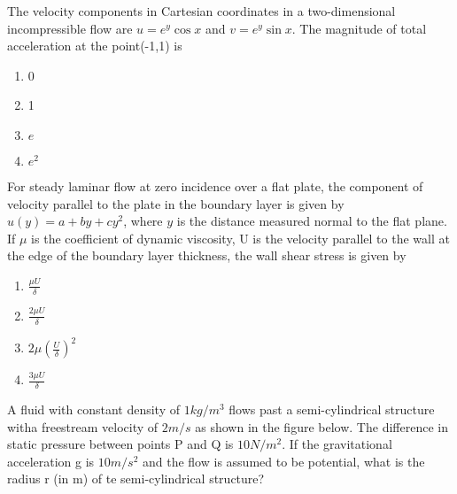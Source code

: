 \item The velocity components in Cartesian coordinates in a two-dimensional incompressible flow are $u=e^y\cos{x}$ and $v=e^y\sin{x}$. The magnitude of total acceleration at the point(-1,1) is
\begin{multicols}{2}   
\begin{enumerate}
    \item 0
    \item 1
    \item $e$
    \item $e^2$
\end{enumerate}
\end{multicols}
\vspace{0.5cm}
\item For steady laminar flow at zero incidence over a flat plate, the component of velocity parallel to the plate in the boundary layer is given by $u(y)=a+by+cy^2$, where $y$ is the distance measured normal to the flat plane. If $\mu$ is the coefficient of dynamic viscosity, U is the velocity parallel to the wall at the edge of the boundary layer thickness, the wall shear stress is given by 
\begin{multicols}{2}
    \begin{enumerate}
        \item $\frac{\mu U}{\delta}$
        \item $\frac{2\mu U}{\delta}$
        \item $2\mu(\frac{U}{\delta})^2$
        \item $\frac{3\mu U}{\delta}$
    \end{enumerate}
\end{multicols}
\item A fluid with constant density of $1kg/m^3$ flows past a semi-cylindrical structure witha freestream velocity of $2m/s$ as shown in the figure below. The difference in static pressure between points P and Q is $10 N/m^2$. If the gravitational acceleration g is $10m/s^2$ and the flow is assumed to be potential, what is the radius r (in m) of te semi-cylindrical structure?
\begin{figure}[H]
\centering
{}%

\end{figure}
